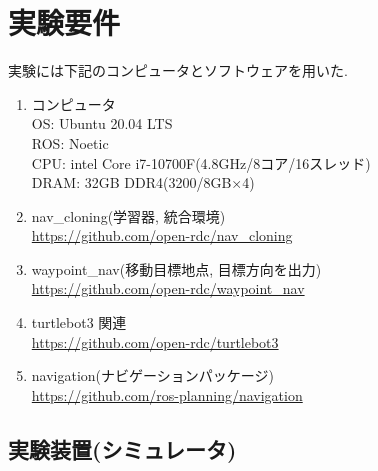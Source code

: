 
\section{実験要件}
実験には下記のコンピュータとソフトウェアを用いた. 

\begin{enumerate}
  \item コンピュータ\\
  OS: Ubuntu 20.04 LTS\\
  ROS: Noetic\\
  CPU: intel Core i7-10700F(4.8GHz/8コア/16スレッド)\\
  DRAM: 32GB DDR4(3200/8GB×4)
  \item nav\_cloning(学習器, 統合環境)\\
  \url{https://github.com/open-rdc/nav_cloning}
  \item waypoint\_nav(移動目標地点, 目標方向を出力)\\
  \url{https://github.com/open-rdc/waypoint_nav}
  \newpage
  \item turtlebot3 関連\\
  \url{https://github.com/open-rdc/turtlebot3}
  \item navigation(ナビゲーションパッケージ)\\
  \url{https://github.com/ros-planning/navigation}
\end{enumerate}

\subsection{実験装置(シミュレータ)}

